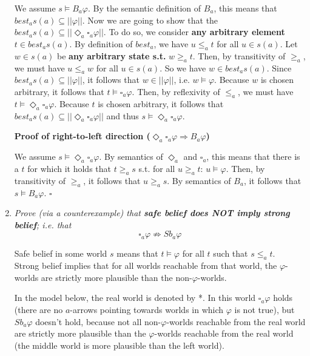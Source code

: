 \documentclass[leqno]{article}
\begin{document}
\begin{enumerate}[label=(\alph*)]
		We assume $s \models B_a \varphi$. 
		By the semantic definition of $B_a$, this means that 
		$best_a s(a) \subseteq ||\varphi||$. 
		Now we are going to show that the 
		$best_a s(a) \subseteq ||\Diamond_a \square_a \varphi||$. 
		To do so, we consider \textbf{any arbitrary element} $t \in best_a s(a)$. 
		By definition of $best_a$, we have $u \le_a t$ for all $u \in s(a)$. 
		Let $w \in s(a)$ be \textbf{any arbitrary state s.t.} $w \ge_a t$. 
		Then, by transitivity of $\ge_a$, we must have $u \le_a w$ for all 
		$u \in s(a)$. 
		So we have $w \in best_a s(a)$. 
		Since $best_a s(a) \subseteq ||\varphi||$, it follows that 
		$w \in ||\varphi||$, i.e. $w \models \varphi$. 
		Because $w$ is chosen arbitrary, it follows that 
		$t \models \square_a \varphi$. 
		Then, by reflexivity of $\le_a$, we must have 
		$t \models \Diamond_a \square_a \varphi$. 
		Because $t$ is chosen arbitrary, it follows that 
		$best_a s(a) \subseteq ||\Diamond_a \square_a \varphi||$ and thus 
		$s \models \Diamond_a \square_a \varphi$.
		
		\textbf{Proof of right-to-left direction 
		($\Diamond_a \square_a \varphi \Rightarrow B_a \varphi$)}
 
 		We assume $s \models \Diamond_a \square_a \varphi$. 
 		By semantics of $\Diamond_a$ and $\square_a$, this means that there is a 
 		$t$ for which it holds that $t \ge_a s$ s.t. for all 
 		$u \ge_a t$: $u \models \varphi$. 
 		Then, by transitivity of $\ge_a$, it follows that $u \ge_a s$.
 		By semantics of $B_a$, it follows that $s \models B_a \varphi$.
		\hfill $\square$

	\item \textit{Prove (via a counterexample) that \textbf{safe belief does NOT
		imply strong belief}; i.e. that}
		$$\square_a \varphi \not\Rightarrow Sb_a \varphi$$

        Safe belief in some world $s$ means that $t \models \varphi$ for all $t$ such that 
        $s \leq_a t$.\\
        Strong belief implies that for all worlds reachable from that world, 
        the $\varphi$-worlds are strictly more plausible than the 
        non-$\varphi$-worlds.
        
        In the model below, the real world is denoted by *. In this world 
        $\square_a \varphi$ holds (there are no $a$-arrows pointing towards 
        worlds in which $\varphi$ is not true), but $Sb_a \varphi$ doesn't hold,
         because not all non-$\varphi$-worlds reachable from the real world are
          strictly more plausible than the $\varphi$-worlds reachable from the 
         real world (the middle world is more plausible than the left world).


\end{enumerate}
\end{document}
